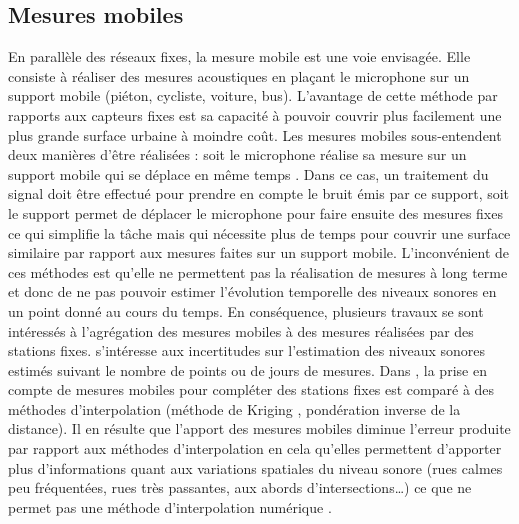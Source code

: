 \subsection{Mesures mobiles}
En parallèle des réseaux fixes, la mesure mobile est une voie envisagée. Elle consiste à réaliser des mesures acoustiques en plaçant le microphone sur un support mobile (piéton, cycliste, voiture, bus). L'avantage de cette méthode par rapports aux capteurs fixes est sa capacité à pouvoir couvrir plus facilement une plus grande surface urbaine à moindre coût. Les mesures mobiles sous-entendent deux manières d'être réalisées : soit le microphone réalise sa mesure sur un support mobile qui se déplace en même temps \cite{alsina-pages_design_2016}. Dans ce cas, un traitement du signal doit être effectué pour prendre en compte le bruit émis par ce support, soit le support permet de déplacer le microphone pour faire ensuite des mesures fixes \cite{manvell2004sadmam} ce qui simplifie la tâche mais qui nécessite plus de temps pour couvrir une surface similaire par rapport aux mesures faites sur un support mobile.
L'inconvénient de ces méthodes est qu'elle ne permettent pas la réalisation de mesures à long terme et donc de ne pas pouvoir estimer l'évolution temporelle des niveaux sonores en un point donné au cours du temps.
En conséquence, plusieurs travaux se sont intéressés à l'agrégation des mesures mobiles à des mesures réalisées par des stations fixes.
\cite{morillas2014uncertainty} s'intéresse aux incertitudes sur l'estimation des niveaux sonores estimés suivant le nombre de points ou de jours de mesures. Dans \cite{can_measurement_2014}, la prise en compte de mesures mobiles pour compléter des stations fixes est comparé à des méthodes d'interpolation (méthode de Kriging , pondération inverse de la distance). Il en résulte que l'apport des mesures mobiles diminue l'erreur produite par rapport aux méthodes d'interpolation en cela qu'elles permettent d'apporter plus d'informations quant aux variations spatiales du niveau sonore (rues calmes peu fréquentées, rues très passantes, aux abords d'intersections\dots) ce que ne permet pas une méthode d'interpolation numérique \cite{aumond2018kriging}.

